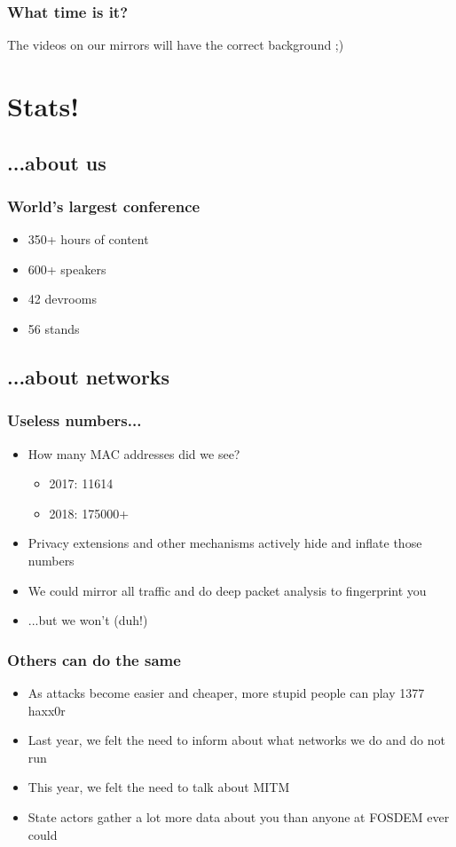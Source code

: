 \documentclass[t]{beamer}
\begin{document}
\begin{frame}
	\frametitle{What time is it?}
	\vfill
	The videos on our mirrors will have the correct background ;)
	\vfill
\end{frame}



\section{Stats!}

\subsection{...about us}

\begin{frame}
	\frametitle{World's largest conference}
	\vfill
	\begin{itemize}
		\item 350+ hours of content
		\item 600+ speakers
		\item 42 devrooms
		\item 56 stands
	\end{itemize}
	\vfill
\end{frame}

\subsection{...about networks}

\begin{frame}
	\frametitle{Useless numbers...}
	\vfill
	\begin{itemize}
		\item How many MAC addresses did we see?
		\begin{itemize}
			\item 2017: 11614
			\item 2018: 175000+
		\end{itemize}
		\item Privacy extensions and other mechanisms actively hide and inflate those numbers
		\item We could mirror all traffic and do deep packet analysis to fingerprint you
		\item ...but we won't (duh!)
	\end{itemize}
	\vfill
\end{frame}

\begin{frame}
	\frametitle{Others can do the same}
	\vfill
	\begin{itemize}
		\item As attacks become easier and cheaper, more stupid people can play 1377 haxx0r
		\item Last year, we felt the need to inform about what networks we do and do not run
		\item This year, we felt the need to talk about MITM
		\item State actors gather a lot more data about you than anyone at FOSDEM ever could
	\end{itemize}
	\vfill
\end{frame}
\end{document}
